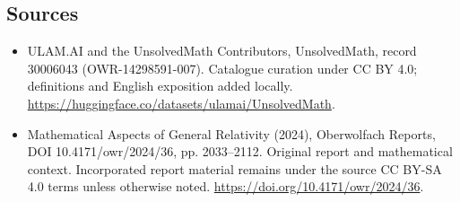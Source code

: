 \documentclass[11pt]{article}
\begin{document}
\subsection{Sources}
\begin{itemize}
\item[\hypertarget{source:30006043:1}{S1}] ULAM.AI and the UnsolvedMath Contributors, UnsolvedMath, record 30006043 (OWR-14298591-007). Catalogue curation under CC BY 4.0; definitions and English exposition added locally.
\url{https://huggingface.co/datasets/ulamai/UnsolvedMath}.
\item[\hypertarget{source:30006043:2}{S2}] Mathematical Aspects of General Relativity (2024), Oberwolfach Reports, DOI 10.4171/owr/2024/36, pp. 2033--2112. Original report and mathematical context. Incorporated report material remains under the source CC BY-SA 4.0 terms unless otherwise noted.
\url{https://doi.org/10.4171/owr/2024/36}.
\end{itemize}
\label{end:30006043}
\end{document}
